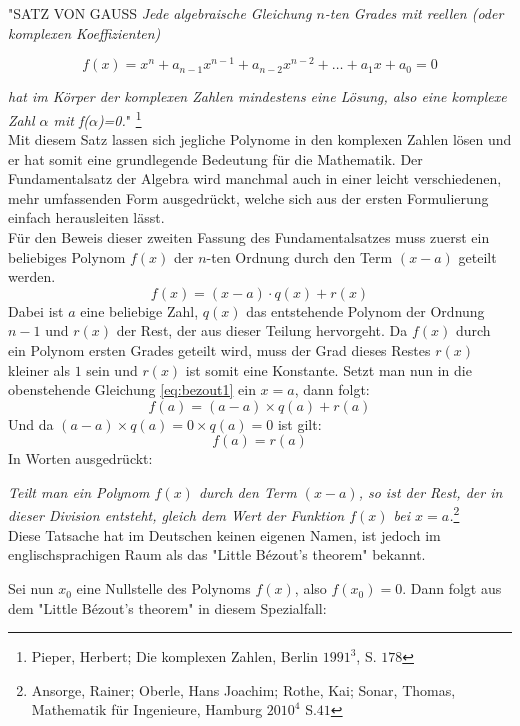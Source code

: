 \documentclass[a4paper,12pt]{article} %
\begin{document}
\noindent "\uppercase{Satz von Gauss} \emph{Jede algebraische Gleichung $n$-ten Grades mit reellen (oder komplexen Koeffizienten)}

\begin{equation}\label{eq:funda}
	\boxed{
		f(x)=x^n + a_{n-1}x^{n-1} + a_{n-2}x^{n-2} + \dots + a_1x + a_0 = 0
	}
\end{equation} 

\noindent \emph{hat im Körper der komplexen Zahlen mindestens eine Lösung, also eine komplexe Zahl $\alpha$ mit f($\alpha$)=0.}"{} 
\footnote{Pieper, Herbert; Die komplexen Zahlen, Berlin $1991^3$, S. $178$}\\

Mit diesem Satz lassen sich jegliche Polynome in den komplexen Zahlen lösen und er hat somit eine grundlegende Bedeutung für die Mathematik.
Der Fundamentalsatz der Algebra wird manchmal auch in einer leicht verschiedenen, mehr umfassenden Form ausgedrückt, welche sich aus der ersten Formulierung einfach herausleiten lässt.\\

Für den Beweis dieser zweiten Fassung des Fundamentalsatzes muss zuerst ein beliebiges Polynom $f(x)$ der $n$-ten Ordnung durch den Term $(x-a)$ geteilt werden.
\begin{equation}\label{eq:bezout1}
f(x) = (x - a) \cdot q(x) + r(x)
\end{equation} 
Dabei ist $a$ eine beliebige Zahl, $q(x)$ das entstehende Polynom der Ordnung $n-1$ und $r(x)$ der Rest, der aus dieser Teilung hervorgeht.
Da $f(x)$ durch ein Polynom ersten Grades geteilt wird, muss der Grad dieses Restes $r(x)$ kleiner als $1$ sein und $r(x)$ ist somit eine Konstante.
Setzt man nun in die obenstehende Gleichung \eqref{eq:bezout1} ein $x=a$, dann folgt:
\[ f(a) = (a-a) \times q(a) + r(a) \]
Und da $(a - a) \times q(a) = 0 \times q(a) = 0 $ ist gilt:
\[ f(a) = r(a) \]
In Worten ausgedrückt:

\noindent \emph{Teilt man ein Polynom $f(x)$ durch den Term $(x-a)$, so ist der Rest, der in dieser Division entsteht, gleich dem Wert der Funktion $f(x)$ bei $x=a$.}\footnote{Ansorge, Rainer; Oberle, Hans Joachim; Rothe, Kai; Sonar, Thomas, Mathematik für Ingenieure, Hamburg $2010^4$ S.$41$}\\

Diese Tatsache hat im Deutschen keinen eigenen Namen, ist jedoch im englischsprachigen Raum als das "Little Bézout's theorem" bekannt. %

Sei nun $x_0$ eine Nullstelle des Polynoms $f(x)$, also $f(x_0)=0$. Dann folgt aus dem "Little Bézout's theorem" {}in diesem Spezialfall:
\end{document}
